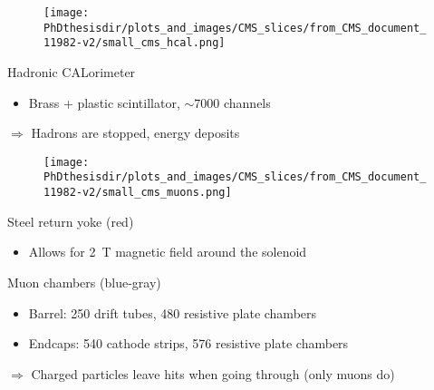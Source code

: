 \begin{frame}
\addtocounter{framenumber}{-1}
\begin{minipage}[t]{.6\textwidth}
\begin{figure}
\texttt{[image: \\PhDthesisdir/plots\_and\_images/CMS\_slices/from\_CMS\_document\_11982-v2/small\_cms\_hcal.png]}
\end{figure}
\end{minipage}
\hfill\begin{minipage}[t]{.35\textwidth}
\begin{block}{Hadronic CALorimeter}
\begin{itemize}
\item Brass + plastic scintillator, $\sim\num{7000}$ channels
\end{itemize}
\end{block}

\begin{block}{}
$\Rightarrow$ Hadrons are stopped, energy deposits
\end{block}
\end{minipage}
\end{frame}

\begin{frame}
\addtocounter{framenumber}{-1}
\begin{minipage}[t]{.6\textwidth}
\begin{figure}
\texttt{[image: \\PhDthesisdir/plots\_and\_images/CMS\_slices/from\_CMS\_document\_11982-v2/small\_cms\_muons.png]}
\end{figure}
\end{minipage}
\hfill\begin{minipage}[t]{.35\textwidth}
\begin{block}{Steel return yoke (red)}
\begin{itemize}
\item Allows for \SI{2}{\tesla} magnetic field around the solenoid
\end{itemize}
\end{block}

\begin{block}{Muon chambers (blue-gray)}
\begin{itemize}
\item Barrel: \num{250} drift tubes, \num{480} resistive plate chambers
\item Endcaps: \num{540} cathode strips, \num{576} resistive plate chambers
\end{itemize}
\end{block}

\begin{block}{}
$\Rightarrow$ Charged particles leave hits when going through (only muons do)
\end{block}
\vspace{-2\baselineskip}
\end{minipage}
\end{frame}

